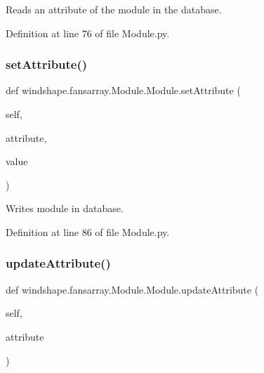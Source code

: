 \begin{DoxyVerb}Reads an attribute of the module in the database.\end{DoxyVerb}
 

Definition at line 76 of file Module.\+py.

\mbox{\label{classwindshape_1_1fansarray_1_1_module_1_1_module_adf9ff452b648c56bc4d3983bd88759e9}} 
\subsubsection{\texorpdfstring{set\+Attribute()}{setAttribute()}}
{\footnotesize\ttfamily def windshape.\+fansarray.\+Module.\+Module.\+set\+Attribute (\begin{DoxyParamCaption}\item[{}]{self,  }\item[{}]{attribute,  }\item[{}]{value }\end{DoxyParamCaption})}

\begin{DoxyVerb}Writes module in database.\end{DoxyVerb}
 

Definition at line 86 of file Module.\+py.

\mbox{\label{classwindshape_1_1fansarray_1_1_module_1_1_module_abe9124728d6647413c921324f659780b}} 
\subsubsection{\texorpdfstring{update\+Attribute()}{updateAttribute()}}
{\footnotesize\ttfamily def windshape.\+fansarray.\+Module.\+Module.\+update\+Attribute (\begin{DoxyParamCaption}\item[{}]{self,  }\item[{}]{attribute }\end{DoxyParamCaption})}

